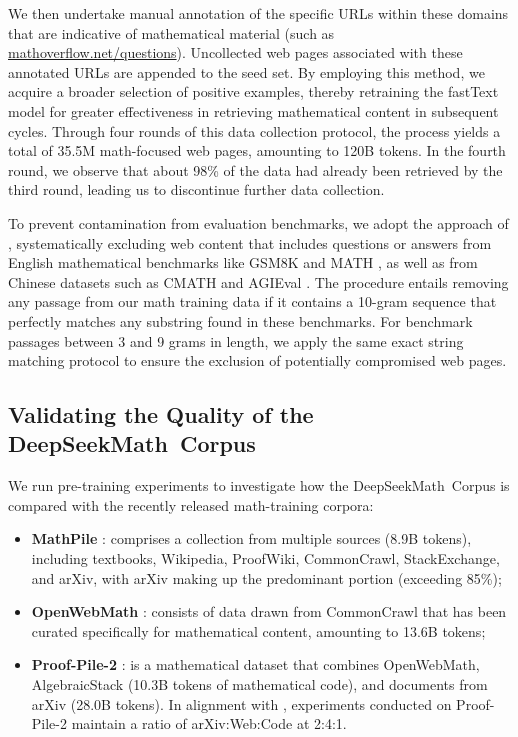 \begin{itemize}[topsep=0pt]
We then undertake manual annotation of the specific URLs within these domains that are indicative of mathematical material (such as \url{mathoverflow.net/questions}). Uncollected web pages associated with these annotated URLs are appended to the seed set. By employing this method, we acquire a broader selection of positive examples, thereby retraining the fastText model for greater effectiveness in retrieving mathematical content in subsequent cycles. Through four rounds of this data collection protocol, the process yields a total of 35.5M math-focused web pages, amounting to 120B tokens. In the fourth round, we observe that about 98\% of the data had already been retrieved by the third round, leading us to discontinue further data collection.

To prevent contamination from evaluation benchmarks, we adopt the approach of \cite{deepseek-coder}, systematically excluding web content that includes questions or answers from English mathematical benchmarks like GSM8K \citep{gsm8k} and MATH \citep{MATH}, as well as from Chinese datasets such as CMATH \citep{wei2023cmath} and AGIEval \citep{agieval}. The procedure entails removing any passage from our math training data if it contains a 10-gram sequence that perfectly matches any substring found in these benchmarks. For benchmark passages between 3 and 9 grams in length, we apply the same exact string matching protocol to ensure the exclusion of potentially compromised web pages.

\subsection{Validating the Quality of the DeepSeekMath~Corpus}

We run pre-training experiments to investigate how the DeepSeekMath~Corpus is compared with the recently released math-training corpora:

\begin{itemize}[topsep=0pt]
    \item \textbf{MathPile} \citep{mathpile}: comprises a collection from multiple sources (8.9B tokens), including textbooks, Wikipedia, ProofWiki, CommonCrawl, StackExchange, and arXiv, with arXiv making up the predominant portion (exceeding 85\%);
    \item \textbf{OpenWebMath} \citep{openwebmath}: consists of data drawn from CommonCrawl that has been curated specifically for mathematical content, amounting to 13.6B tokens;
    \item \textbf{Proof-Pile-2} \citep{llemma}: is a mathematical dataset that combines OpenWebMath, AlgebraicStack (10.3B tokens of mathematical code), and documents from arXiv (28.0B tokens). In alignment with \cite{llemma}, experiments conducted on Proof-Pile-2 maintain a ratio of arXiv:Web:Code at 2:4:1.
\end{itemize}


\end{itemize}
